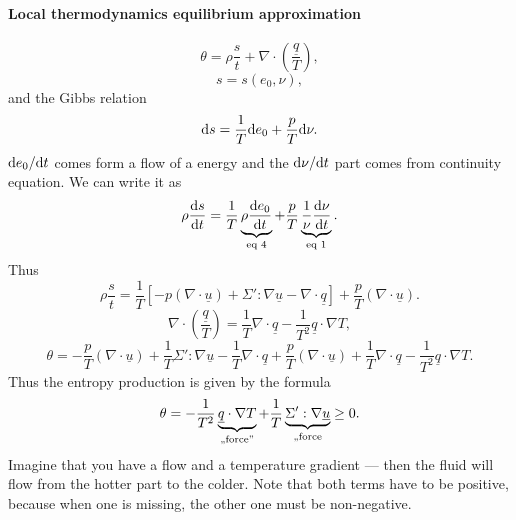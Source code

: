 \documentclass[11pt,oneside]{book}
\renewcommand{\vec}[1]{\underline{#1}}
\theoremstyle{definition} %
\theoremstyle{plain} %
\theoremstyle{remark} %
\theoremstyle{underline}
\begin{document}
  \paragraph{Local thermodynamics equilibrium approximation}
  \begin{displaymath}
    \theta = \rho \dfrac{s}{t} + \nabla \cdot \left( \frac{\vec q}{T} \right),
  \end{displaymath}
  \begin{displaymath}
    s = s(e_0, \nu),
  \end{displaymath}
  and the Gibbs relation
  \begin{displaymath}
    \mathrm{d} s = \frac{1}{T}\mathrm{d} e_0 + \frac{p}{T} \mathrm{d} \nu.
  \end{displaymath}
  $\mathrm{d} e_0/\mathrm{d} t$ comes form a flow of a energy and the $\mathrm{d} \nu / \mathrm{d} t$ part comes from continuity equation.
  We can write it as
  \begin{displaymath}
    \rho \frac{\mathrm{d} s}{\mathrm{d} t} = \frac{1}{T} \underbrace{\rho \frac{\mathrm{d} e_0}{\mathrm{d} t}}_{\textrm{eq } 4} 
    + \frac{p}{T} \underbrace{\frac{1}{\nu} \frac{\mathrm{d} \nu }{\mathrm{d} t}}_{\textrm{eq } 1}.
  \end{displaymath}
  Thus
  \begin{displaymath}
    \rho \dfrac{s}{t} = \frac{1}{T} \left[ - p (\nabla \cdot \vec u) + \Sigma' : \nabla \vec u - \nabla \cdot \vec q \right]
    + \frac{p}{T} (\nabla \cdot \vec u).
  \end{displaymath}
  \begin{displaymath}
    \nabla \cdot \left( \frac{\vec q }{T} \right) = \frac{1}{T} \nabla \cdot \vec q - \frac{1}{T^2} \vec q \cdot \nabla T,
  \end{displaymath}
  \begin{displaymath}
    \theta = - \frac{p}{T} (\nabla \cdot \vec u) + \frac{1}{T} \Sigma' : \nabla \vec u - \frac{1}{T} \nabla \cdot \vec q
    + \frac{p}{T} (\nabla \cdot \vec u) + \frac{1}{T} \nabla \cdot \vec q - \frac{1}{T^2} \vec q \cdot \nabla T.
  \end{displaymath}
  Thus the entropy production is given by the formula
  \begin{displaymath}
    \theta = - \frac{1}{T^2} \underbrace{\vec q \cdot \nabla T}_{\tm{,,force''}} + \frac{1}{T} \underbrace{\Sigma' : \nabla \vec u}_{\tm{,,force}} \geq 0.
  \end{displaymath}
  Imagine that you have a flow and a temperature gradient --- then the fluid will flow from the hotter part to the colder.
  Note that both terms have to be positive, because when one is missing, the other one must be non-negative.
\end{document}
